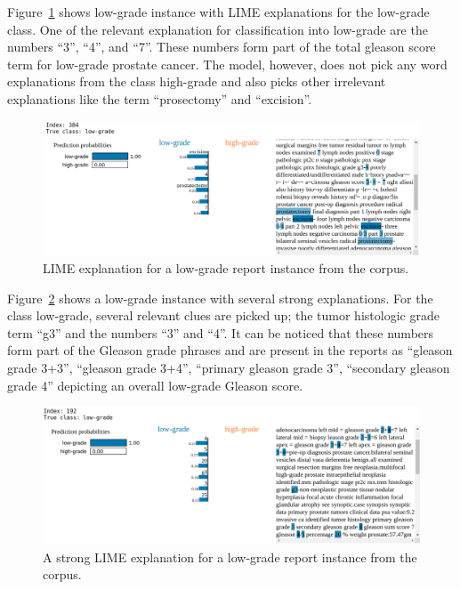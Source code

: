 \documentclass[runningheads]{llncs}
\begin{document}
Figure~\ref{fig:LIME1} shows low-grade instance with LIME explanations for the low-grade class.
One of the relevant explanation for classification into low-grade are the numbers ``3'', ``4'', and ``7''.
These numbers form part of the total gleason score term for low-grade prostate cancer.
The model, however, does not pick any word explanations from the class high-grade and also picks other irrelevant explanations like the term ``prosectomy'' and ``excision''.
%
\begin{figure}[h!]
    \centering
    \includegraphics[scale=0.3]{figures/strong_lowgrade.png}
    \caption{LIME explanation for a low-grade report instance from the corpus.}
    \label{fig:LIME1}
\end{figure}
%

Figure~\ref{fig:LIME2} shows a low-grade instance with several strong explanations.
For the class low-grade, several relevant clues are picked up; the tumor histologic grade term ``g3'' and the numbers ``3'' and ``4''. 
It can be noticed that these numbers form part of the Gleason grade phrases and are present in the reports as ``gleason grade 3+3'', ``gleason grade 3+4'', ``primary gleason grade 3'', ``secondary gleason grade 4'' depicting an overall low-grade Gleason score.
%
\begin{figure}[h!]
    \centering
    \includegraphics[scale=0.30]{figures/superStrongLowGrade.png}
    \caption{A strong LIME explanation for a low-grade report instance from the corpus.}
    \label{fig:LIME2}
\end{figure}
%
\end{document}
